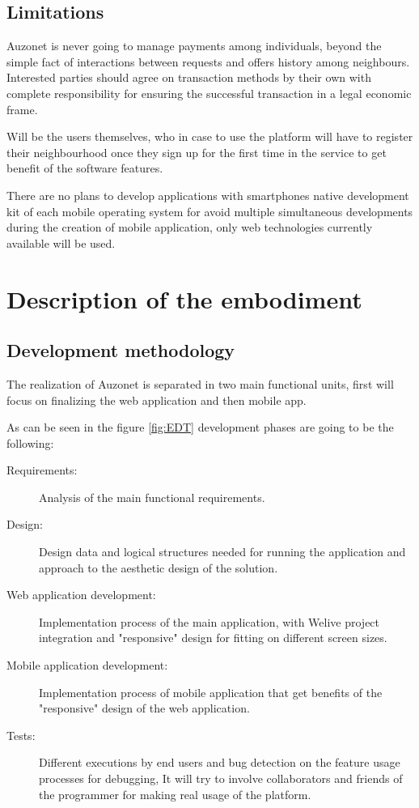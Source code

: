 \documentclass{DeustoFDP}
\begin{document}
\subsection{Limitations}
Auzonet is never going to manage payments among individuals, beyond the simple fact of interactions between requests and offers history among neighbours. Interested parties should agree on transaction methods by their own with complete responsibility for ensuring the successful transaction in a legal economic frame.

Will be the users themselves, who in case to use the platform will have to register their neighbourhood once they sign up for the first time in the service to get benefit of the software features.

There are no plans to develop applications with smartphones native development kit of each mobile operating system for avoid multiple simultaneous developments during the creation of  mobile application, only web technologies currently available will be used.

\section{Description of the embodiment}
\subsection{Development methodology}
The realization of Auzonet is separated in two main functional units, first will focus on finalizing the web application and then mobile app.

As can be seen in the figure \ref{fig:EDT} development phases are going to be the following:
\begin{description}
	\item[Requirements:] Analysis of the main functional requirements.
	\item[Design:] Design data and logical structures needed for running the application and approach to the aesthetic design of the solution.
	\item[Web application development:] Implementation process of the main application, with Welive project integration and "responsive" design for fitting on different screen sizes.
	\item[Mobile application development:] Implementation process of mobile application that get benefits of the "responsive" design of the web application.
	\item[Tests:] Different executions by end users and bug detection on the feature usage processes for debugging, It will try to involve collaborators and friends of the programmer for making real usage of the platform.
\end{description}
\end{document}
